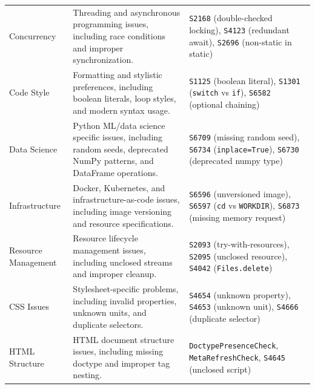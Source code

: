 \begin{table}
\begin{tabular}{@{}lp{6.25cm}p{6.25cm}@{}}
Concurrency & 
Threading and asynchronous programming issues, including race conditions and improper synchronization. &
\texttt{S2168} (double-checked locking), \texttt{S4123} (redundant await), \texttt{S2696} (non-static in static) \\
\addlinespace

Code Style & 
Formatting and stylistic preferences, including boolean literals, loop styles, and modern syntax usage. &
\texttt{S1125} (boolean literal), \texttt{S1301} (\texttt{switch} vs \texttt{if}), \texttt{S6582} (optional chaining) \\
\addlinespace

Data Science & 
Python ML/data science specific issues, including random seeds, deprecated NumPy patterns, and DataFrame operations. &
\texttt{S6709} (missing random seed), \texttt{S6734} (\texttt{inplace=True}), \texttt{S6730} (deprecated numpy type) \\
\addlinespace

Infrastructure & 
Docker, Kubernetes, and infrastructure-as-code issues, including image versioning and resource specifications. &
\texttt{S6596} (unversioned image), \texttt{S6597} (\texttt{cd} vs \texttt{WORKDIR}), \texttt{S6873} (missing memory request) \\
\addlinespace

Resource Management & 
Resource lifecycle management issues, including unclosed streams and improper cleanup. &
\texttt{S2093} (try-with-resources), \texttt{S2095} (unclosed resource), \texttt{S4042} (\texttt{Files.delete}) \\
\addlinespace

CSS Issues & 
Stylesheet-specific problems, including invalid properties, unknown units, and duplicate selectors. &
\texttt{S4654} (unknown property), \texttt{S4653} (unknown unit), \texttt{S4666} (duplicate selector) \\
\addlinespace

HTML Structure & 
HTML document structure issues, including missing doctype and improper tag nesting. &
\texttt{DoctypePresenceCheck}, \texttt{MetaRefreshCheck}, \texttt{S4645} (unclosed script) \\

\bottomrule
\end{tabular}
\end{table}
